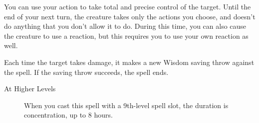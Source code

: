 \documentclass[letterpaper,10pt,twoside,twocolumn,openany]{book}
\begin{document}
You can use your action to take total and precise control of the target. Until the end of your next turn, the creature takes only the actions you choose, and doesn't do anything that you don't allow it to do. During this time, you can also cause the creature to use a reaction, but this requires you to use your own reaction as well.

Each time the target takes damage, it makes a new Wisdom saving throw against the spell. If the saving throw succeeds, the spell ends. 

\begin{description}
	\item[At Higher Levels] When you cast this spell with a 9th-level spell slot, the duration is concentration, up to 8 hours.
\end{description}

\end{document}
